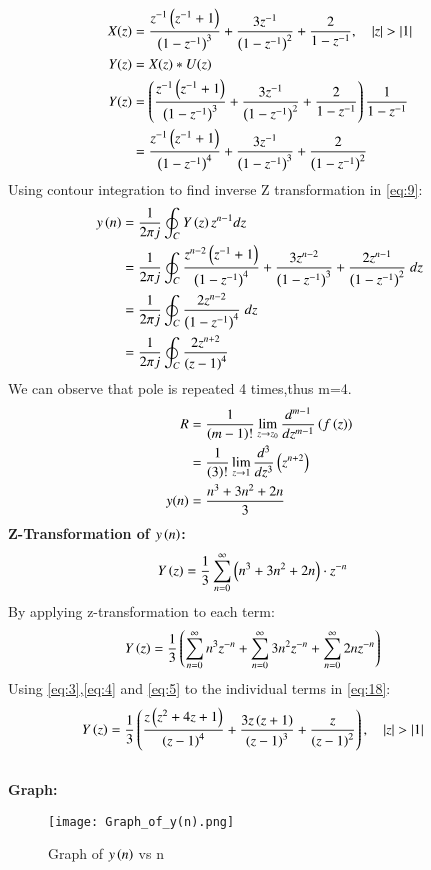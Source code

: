 \documentclass[journal,12pt,twocolumn]{IEEEtran}
\theoremstyle{remark}
\begin{document}
\begin{align}
    X(z)&=\frac{z^{-1}\left(z^{-1}+1\right)}{\left(1-z^{-1}\right)^3}+\frac{3z^{-1}}{\left(1-z^{-1}\right)^2}+\frac{2}{1-z^{-1}},\quad\left\vert z\right\vert>\left\vert1\right\vert\label{eq:6}\\
    Y(z)&=X(z)*U(z)\label{eq:7}\\
    Y(z)&=\left(\frac{z^{-1}\left(z^{-1}+1\right)}{\left(1-z^{-1}\right)^3}+\frac{3z^{-1}}{\left(1-z^{-1}\right)^2}+\frac{2}{1-z^{-1}}\right)\frac{1}{1-z^{-1}}\label{eq:8}\\
    &=\frac{z^{-1}\left(z^{-1}+1\right)}{\left(1-z^{-1}\right)^4}+\frac{3z^{-1}}{\left(1-z^{-1}\right)^3}+\frac{2}{\left(1-z^{-1}\right)^2}\label{eq:9}
\end{align}
Using contour integration to find inverse Z transformation in \eqref{eq:9}:
\begin{align}
     y\left(n\right) & =  \frac{1}{2\pi j} \oint_C Y\left(z\right) z^{n-1} dz\label{eq:10}\\
    &=\frac{1}{2\pi j}\oint_{C}\frac{z^{n-2}\left(z^{-1}+1\right)}{\left(1-z^{-1}\right)^4}+\frac{3z^{n-2}}{\left(1-z^{-1}\right)^3}+\frac{2z^{n-1}}{\left(1-z^{-1}\right)^2} \;dz\label{eq:11}\\
   &=\frac{1}{2\pi j}\oint_{C}\frac{2z^{n-2}}{\left(1-z^{-1}\right)^4}\;dz\label{eq:12}\\
   &=\frac{1}{2\pi j}\oint_{C}\frac{2z^{n+2}}{\left(z-1\right)^4}\label{eq:13}
\end{align}
We can observe that pole is repeated 4 times,thus m=4.
\begin{align}
 R&=\frac{1}{\left(m-1\right)!}\lim\limits_{z\to z_{0}}\frac{d^{m-1}}{dz^{m-1}}\left(f\left(z\right)\right)\label{eq:14}\\
 &=\frac{1}{\left(3\right)!}\lim\limits_{z\to 1}\frac{d^{3}}{dz^{3}}\left(z^{n+2}\right)\label{eq:15}\\
 y(n)&=\frac{n^3+3n^2+2n}{3}\label{eq:16}
\end{align}
\textbf{Z-Transformation of $y\left(n\right)$:}\\
\begin{align}
Y\left(z\right)&=\frac{1}{3} \sum_{n=0}^{\infty} \left(n^3 + 3n^2 + 2n\right)\cdot z^{-n}\label{eq:17}
\end{align}
By applying z-transformation to each term:
\begin{align}
    Y\left(z\right)&=\frac{1}{3}\left(\sum_{n=0}^{\infty}n^3 z^{-n}+\sum_{n=0}^{\infty}3n^2z^{-n}+\sum_{n=0}^{\infty}2nz^{-n}\right) \label{eq:18}
\end{align}
Using \eqref{eq:3},\eqref{eq:4} and \eqref{eq:5} to the individual terms in \eqref{eq:18}:
\begin{align}
    Y\left(z\right)&=\frac{1}{3} \left(\frac{z\left(z^2+4z+1\right)}{\left(z-1\right)^4} + \frac{3z\left(z+1\right)}{\left(z-1\right)^3} + \frac{z}{\left(z-1\right)^2}\right),\quad\left\vert z\right\vert>\left\vert1\right\vert\label{eq:19}
\end{align}\\
\newpage
\textbf{Graph:}
\begin{figure}[h]
        \centering
\texttt{[image: Graph\_of\_y(n).png]}
\caption{Graph of $y\left(n\right)$ vs n}
\label{fig:enter-label}
\end{figure}
\end{document}
